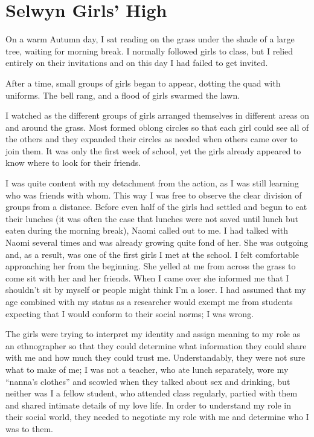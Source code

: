 
\section{Selwyn Girls' High}
On a warm Autumn day, I sat reading on the grass under the shade of a large tree, waiting for morning break.  I normally followed girls to class, but I relied entirely on their invitations and on this day I had failed to get invited.  


After a time, small groups of girls began to appear, dotting the quad with uniforms.  The bell rang, and a flood of girls swarmed the lawn.  

I watched as the different groups of girls arranged themselves in different areas on and around the grass.  Most formed oblong circles so that each girl could see all of the others and they expanded their circles as needed when others came over to join them.  It was only the first week of school, yet the girls already appeared to know where to look for their friends.  

I was quite content with my detachment from the action, as I was still learning who was friends with whom.  This way I was free to observe the clear division of groups from a distance.  Before even half of the girls had settled and begun to eat their lunches (it was often the case that lunches were not saved until lunch but eaten during the morning break), Naomi called out to me.  I had talked with Naomi several times and was already growing quite fond of her.  She was outgoing and, as a result, was one of the first girls I met at the school. I felt comfortable approaching her from the beginning.  She yelled at me from across the grass to come sit with her and her friends.  When I came over she informed me that I shouldn't sit by myself or people might think I'm a loser.  I had assumed that my age combined with my status as a researcher would exempt me from students expecting that I would conform to their social norms; I was wrong.

The girls were trying to interpret my identity and assign meaning to my role as an ethnographer so that they could determine what information they could share with me and how much they could trust me.  Understandably, they were not sure what to make of me; I was not a teacher, who ate lunch separately, wore my ``nanna's clothes'' and scowled when they talked about sex and drinking, but neither was I a fellow student, who attended class regularly, partied with them and shared intimate details of my love life. In order to understand my role in their social world, they needed to negotiate my role with me and determine who I was to them.

